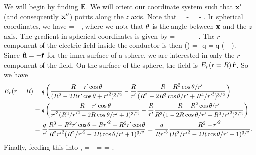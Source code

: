 \begin{solution}
	We will begin by finding $\mathbf{E}$.  We will orient our coordinate system such that $\mathbf{x}'$ (and consequently $\mathbf{x}''$) points along the $z$ axis.  Note that
	\beq
		\Gdxxp =  - 
		=  - .
	\eeq
	In spherical coordinates, we have
	\beq
		\Gdxxp =  -  ,
	\eeq
	where we note that $\theta$ is the angle between $\mathbf{x}$ and the $z$ axis.  The gradient in spherical coordinates is given by
	\beq
		\nabla =  \,\rh +  \pdv{}{\tht} \,\thh +  \pdv{}{\vph} \, \phh.
	\eeq
	The $r$ component of the electric field inside the conductor is then
	\beq
		\Er(\vx) = -q 
		= q \left(  -   \right).
	\eeq
	Since $\mathbf{\hat{n}} = -\mathbf{\hat{r}}$ for the inner surface of a sphere, we are interested in only the $r$ component of the field.  On the surface of the sphere, the field is $E_r(r=R) \,\mathbf{\hat{r}}$.  So we have
	\begin{align*}
		E_r(r=R) &= q \left( \frac{R - r' \cos\theta}{(R^2 - 2 R r' \cos\theta + {r'}^2)^{3/2}} - \frac{R}{r'} \frac{R - R^2 \cos\theta / r'}{(R^2 - 2 R^3 \cos\theta / r' + R^4 / {r'}^2)^{3/2}} \right) \\
		&= q \left( \frac{R - r' \cos\theta}{{r'}^3 (R^2 / {r'}^2 - 2 R \cos\theta / r' + 1)^{3/2}} - \frac{R}{r'} \frac{R - R^2 \cos\theta / r'}{R^3 (1 - 2 R \cos\theta / r' + R^2 / {r'}^2)^{3/2}} \right) \\
		&= \frac{q}{r'} \frac{R^3 - R^2 r' \cos\theta - R {r'}^2 + R^2 r' \cos\theta}{R^2 {r'}^2 (R^2 / {r'}^2 - 2 R \cos\theta / r' + 1)^{3/2}}
		= \frac{q}{R {r'}^3} \frac{R^2 - {r'}^2}{(R^2 / {r'}^2 - 2 R \cos\theta / r' + 1)^{3/2}}.
	\end{align*}
	Finally, feeding this into ,
	\beq
		\sig = -\frac{\vE \cdot \rh}{4\pi}
		=  
		=  .
	\eeq
\end{solution}
\vfix


\newcommand{\vEo}{\vE_0}
\newcommand{\del}{\delta}
\newcommand{\Etht}{E_\tht}
\newcommand{\Fr}{F_r}

